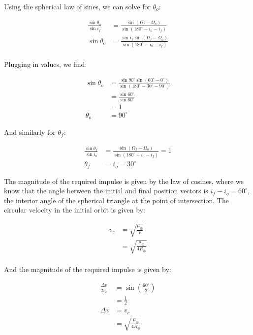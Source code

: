 Using the spherical law of sines, we can solve for $\theta_o$:

\begin{align*}
    \frac{\sin\theta_o}{\sin i_f} &= \frac{\sin(\Omega_f - \Omega_o)}{\sin\left(180^\circ-i_0-i_f\right)} \\
    \sin\theta_o &= \frac{\sin i_f \sin(\Omega_f - \Omega_o)}{\sin\left(180^\circ-i_0-i_f\right)} \\
\end{align*}

Plugging in values, we find:

\begin{align*}
    \sin\theta_o &= \frac{\sin 90^\circ \sin(60^\circ - 0^\circ)}{\sin\left(180^\circ-30^\circ-90^\circ\right)} \\
    &= \frac{\sin 60^\circ}{\sin 60^\circ} \\
    &= 1 \\
    \theta_o &= 90^\circ
\end{align*}

And similarly for $\theta_f$:

\begin{align*}
    \frac{\sin\theta_f}{\sin i_o} &= \frac{\sin(\Omega_f - \Omega_o)}{\sin\left(180^\circ-i_0-i_f\right)} = 1 \\
    \theta_f &= i_o = 30^\circ
\end{align*}

The magnitude of the required impulse is given by the law of cosines, where we know that the angle between the initial and final position vectors is $i_f - i_o = 60^\circ$, the interior angle of the spherical triangle at the point of intersection. The circular velocity in the initial orbit is given by:

\begin{align*}
    v_c &= \sqrt{\frac{\mu_\oplus}{r}} \\
    &= \sqrt{\frac{\mu_\oplus}{4R_\oplus}} \\
\end{align*}

And the magnitude of the required impulse is given by:

\begin{align*}
    \frac{\Delta v}{2 v_c} &= \sin\left( \frac{60^\circ}{2} \right) \\
    &= \frac{1}{2} \\
    \Delta v &= v_c \\
    &= \sqrt{\frac{\mu_\oplus}{4R_\oplus}} \\
\end{align*}

